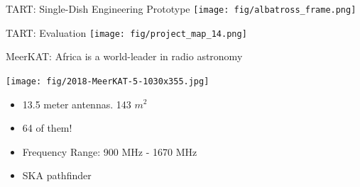 \documentclass[ignorenonframetext]{beamer}
\begin{document}
\begin{frame}{TART: Single-Dish Engineering Prototype}
   \texttt{[image: fig/albatross\_frame.png]}
\end{frame}

\begin{frame}{TART: Evaluation}
   \texttt{[image: fig/project\_map\_14.png]}
\end{frame}


% 


% 



\begin{frame}{MeerKAT: Africa is a world-leader in radio astronomy}
\begin{center}
  \texttt{[image: fig/2018-MeerKAT-5-1030x355.jpg]}
\end{center}
\begin{itemize}
 \item 13.5 meter antennas. 143 $m^2$
 \item 64 of them!
 \item Frequency Range: 900 MHz - 1670 MHz
 \item SKA pathfinder
\end{itemize}

\end{frame}
\end{document}
